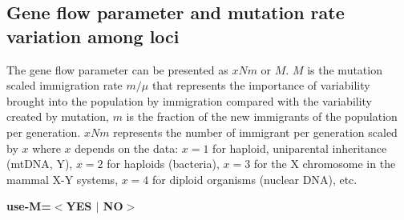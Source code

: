 \subsection*{Gene flow parameter and mutation rate variation among loci}
The gene flow parameter can be presented as $xNm$ or $M$. $M$ is the mutation scaled immigration rate $m/\mu$ that represents the importance of variability brought into the population by immigration compared with the variability created by mutation, $m$ is the fraction of the new immigrants of the population per generation. $xNm$ represents the number of immigrant per generation scaled by $x$ where $x$ depends on the data: $x=1$ for haploid, uniparental inheritance (mtDNA, Y), $x=2$ for haploids (bacteria), $x=3$ for the X chromosome in the mammal X-Y systems, $x=4$ for diploid organisms (nuclear DNA), etc. 
\begin{description}
\item \textbf{ use-M=$<$YES $|$ NO$>$}



\end{description}
